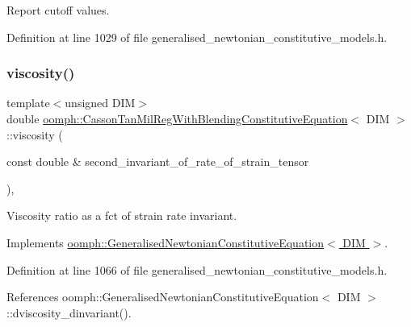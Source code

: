 Report cutoff values. 



Definition at line 1029 of file generalised\+\_\+newtonian\+\_\+constitutive\+\_\+models.\+h.

\mbox{\label{classoomph_1_1CassonTanMilRegWithBlendingConstitutiveEquation_a6794675f3a7e2def339b01a5f9a71447}} 
\subsubsection{\texorpdfstring{viscosity()}{viscosity()}}
{\footnotesize\ttfamily template$<$unsigned D\+IM$>$ \\
double \hyperlink{classoomph_1_1CassonTanMilRegWithBlendingConstitutiveEquation}{oomph\+::\+Casson\+Tan\+Mil\+Reg\+With\+Blending\+Constitutive\+Equation}$<$ D\+IM $>$\+::viscosity (\begin{DoxyParamCaption}\item[{const double \&}]{second\+\_\+invariant\+\_\+of\+\_\+rate\+\_\+of\+\_\+strain\+\_\+tensor }\end{DoxyParamCaption})\hspace{0.3cm}{\ttfamily [inline]}, {\ttfamily [virtual]}}



Viscosity ratio as a fct of strain rate invariant. 



Implements \hyperlink{classoomph_1_1GeneralisedNewtonianConstitutiveEquation_a3e6d811786e39ca3c3a9b1c46249442f}{oomph\+::\+Generalised\+Newtonian\+Constitutive\+Equation$<$ D\+I\+M $>$}.



Definition at line 1066 of file generalised\+\_\+newtonian\+\_\+constitutive\+\_\+models.\+h.



References oomph\+::\+Generalised\+Newtonian\+Constitutive\+Equation$<$ D\+I\+M $>$\+::dviscosity\+\_\+dinvariant().



